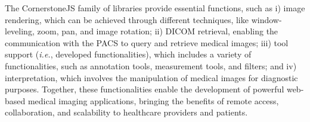 


The CornerstoneJS family of libraries provide essential functions, such as
i) image rendering, which can be achieved through different techniques, like window-leveling, zoom, pan, and image rotation;
ii) \ac{DICOM} retrieval, enabling the communication with the \ac{PACS} to query and retrieve medical images;
iii) tool support ({\it i.e.}, developed functionalities), which includes a variety of functionalities, such as annotation tools, measurement tools, and filters; and
iv) interpretation, which involves the manipulation of medical images for diagnostic purposes.
Together, these functionalities enable the development of powerful web-based medical imaging applications, bringing the benefits of remote access, collaboration, and scalability to healthcare providers and patients.

